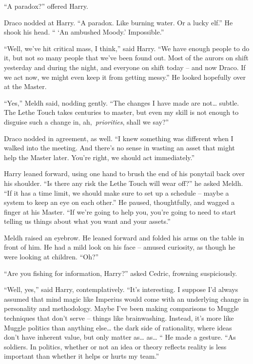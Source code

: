 ``A paradox?'' offered Harry.

Draco nodded at Harry. ``A paradox. Like burning water. Or a lucky
elf.'' He shook his head. `` `An ambushed Moody.' Impossible.''

``Well, we've hit critical mass, I think,'' said Harry. ``We have enough
people to do it, but not so many people that we've been found out. Most
of the aurors on shift yesterday and during the night, and everyone on
shift today -- and now Draco. If we act now, we might even keep it from
getting messy.'' He looked hopefully over at the Master.

``Yes,'' Meldh said, nodding gently. ``The changes I have made are
not\ldots{} subtle. The Lethe Touch takes centuries to master, but even
my skill is not enough to disguise such a change in,
ah,~\emph{priorities}, shall we say?''

Draco nodded in agreement, as well. ``I knew something was different
when I walked into the meeting. And there's no sense in wasting an asset
that might help the Master later. You're right, we should act
immediately.''

Harry leaned forward, using one hand to brush the end of his ponytail
back over his shoulder. ``Is there any risk the Lethe Touch will wear
off?'' he asked Meldh. ``If it has a time limit, we should make sure to
set up a schedule -- maybe a system to keep an eye on each other.'' He
paused, thoughtfully, and wagged a finger at his Master. ``If we're
going to help you, you're going to need to start telling us things about
what you want and your assets.''

Meldh raised an eyebrow. He leaned forward and folded his arms on the
table in front of him. He had a mild look on his face -- amused
curiosity, as though he were looking at children. ``Oh?''

``Are you fishing for information, Harry?'' asked Cedric, frowning
suspiciously.

``Well, yes,'' said Harry, contemplatively. ``It's interesting. I
suppose I'd always assumed that mind magic like Imperius would come with
an underlying change in personality and methodology. Maybe I've been
making comparisons to Muggle techniques that don't serve -- things like
brainwashing. Instead, it's more like Muggle politics than anything
else\ldots{} the dark side of rationality, where ideas don't have
inherent value, but only matter as\ldots{} as\ldots{} `` He made a
gesture. ``As soldiers. In politics, whether or not an idea or theory
reflects reality is less important than whether it helps or hurts my
team.''

